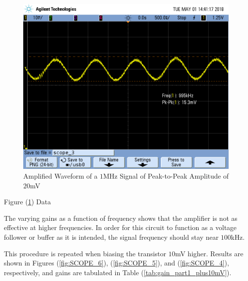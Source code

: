 \FloatBarrier

\begin{figure}[h!]
	\centering
	\includegraphics[scale=0.45]{./images/SCOPE_3.PNG}
	\caption{Amplified Waveform of a $1$\si{\mega\hertz} Signal of Peak-to-Peak Amplitude of $20$\si{\milli\volt}}
	\label{fig:SCOPE_3}
\end{figure}

\FloatBarrier

\begin{table}[h!]
	\centering
	\caption{Figure (\ref{fig:SCOPE_3}) Data}
	\label{tab:gain_part1}
\end{table}

\FloatBarrier

The varying gains as a function of frequency shows that the amplifier is not as effective at higher frequencies. In order for this circuit to function as a voltage follower or buffer as it is intended, the signal frequency should stay near $100$\si{\kilo\hertz}.

This procedure is repeated when biasing the transistor $10$\si{\milli\volt} higher. Results are shown in Figures (\ref{fig:SCOPE_6}), (\ref{fig:SCOPE_5}), and (\ref{fig:SCOPE_4}), respectively, and gains are tabulated in Table (\ref{tab:gain_part1_plus10mV}).

\FloatBarrier

